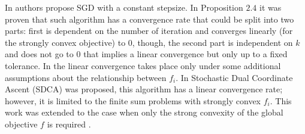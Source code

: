 In \cite{solodov1998incremental, nedic2001convergence} authors propose SGD with a constant stepsize. In Proposition $2.4$ \cite{nedic2001convergence} it was proven that such algorithm has a convergence rate that could be split into two parts: first is dependent on the number of iteration and converges linearly (for the strongly convex objective) to $0$, though, the second part is independent on $k$ and does not go to $0$ that implies a linear convergence but only up to a fixed tolerance. In \cite{solodov1998incremental} the linear convergence takes place only under some additional assumptions about the relationship between $f_i$. In \cite{shalev2013stochastic} Stochastic Dual Coordinate Ascent (SDCA) was proposed, this algorithm has a linear convergence rate; however, it is limited to the finite sum problems with strongly convex $f_i$. This work was extended to the case when only the strong convexity of the global objective $f$ is required \cite{shalev2016sdca}.

